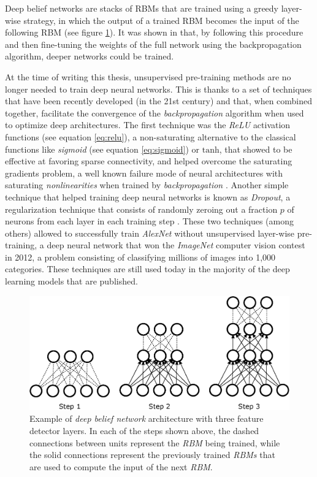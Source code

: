 Deep belief networks are stacks of RBMs that are trained using a greedy layer-wise strategy, in which the output of a trained RBM becomes the input of the following RBM \autocite{hinton2006} (see figure \ref{fig:dbn}). It was shown in \autocite{Bengio2007} that, by following this procedure and then fine-tuning the weights of the full network using the backpropagation algorithm, deeper networks could be trained.


At the time of writing this thesis, unsupervised pre-training methods are no longer needed to train deep neural networks. This is thanks to a set of techniques that have been recently developed (in the 21st century) and that, when combined together, facilitate the convergence of the \textit{backpropagation} algorithm when used to optimize deep architectures. The first technique was the \textit{ReLU} \autocite{nair2010} activation functions (see equation \ref{eq:relu}), a non-saturating alternative to the classical functions like \textit{sigmoid} (see equation \ref{eq:sigmoid}) or $\mathrm{tanh}$, that showed to be effective at favoring sparse connectivity, and helped overcome the saturating gradients problem, a well known failure mode of neural architectures with saturating \textit{nonlinearities} when trained by \textit{backpropagation} \autocite{Hong2019}. Another simple technique that helped training deep neural networks is known as \textit{Dropout}, a regularization technique that consists of randomly zeroing out a fraction $p$ of neurons from each layer in each training step \autocite{hinton2012, srivastava2014}. These two techniques (among others) allowed \citealp{krizhevsky2012} to successfully train \textit{AlexNet}  without unsupervised layer-wise pre-training, a deep neural network that won the \textit{ImageNet} \autocite{deng2009imagenet} computer vision contest in 2012, a problem consisting of classifying millions of images into 1,000 categories. These techniques are still used today in the majority of the deep learning models that are published.

\begin{figure}
	\centering
	\includegraphics[width=1\linewidth]{background/images/dbn}
	\caption[Deep belief network]{Example of \textit{deep belief network} architecture with three feature detector layers. In each of the steps shown above, the dashed connections between units represent the \textit{RBM} being trained, while the solid connections represent the previously trained \textit{RBMs} that are used to compute the input of the next \textit{RBM}.}
	\label{fig:dbn}
\end{figure}



